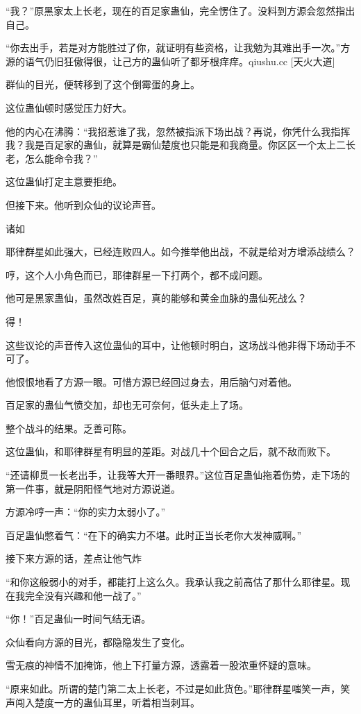 \begin{this_body}
“我？”原黑家太上长老，现在的百足家蛊仙，完全愣住了。没料到方源会忽然指出自己。

“你去出手，若是对方能胜过了你，就证明有些资格，让我勉为其难出手一次。”方源的语气仍旧狂傲得很，让己方的蛊仙听了都牙根痒痒。qiushu.cc [天火大道]

群仙的目光，便转移到了这个倒霉蛋的身上。

这位蛊仙顿时感觉压力好大。

他的内心在沸腾：“我招惹谁了我，忽然被指派下场出战？再说，你凭什么我指挥我？我是百足家的蛊仙，就算是霸仙楚度也只能是和我商量。你区区一个太上二长老，怎么能命令我？”

这位蛊仙打定主意要拒绝。

但接下来。他听到众仙的议论声音。

诸如

耶律群星如此强大，已经连败四人。如今推举他出战，不就是给对方增添战绩么？

哼，这个人小角色而已，耶律群星一下打两个，都不成问题。

他可是黑家蛊仙，虽然改姓百足，真的能够和黄金血脉的蛊仙死战么？

得！

这些议论的声音传入这位蛊仙的耳中，让他顿时明白，这场战斗他非得下场动手不可了。

他恨恨地看了方源一眼。可惜方源已经回过身去，用后脑勺对着他。

百足家的蛊仙气愤交加，却也无可奈何，低头走上了场。

整个战斗的结果。乏善可陈。

这位蛊仙，和耶律群星有明显的差距。对战几十个回合之后，就不敌而败下。

“还请柳贯一长老出手，让我等大开一番眼界。”这位百足蛊仙拖着伤势，走下场的第一件事，就是阴阳怪气地对方源说道。

方源冷哼一声：“你的实力太弱小了。”

百足蛊仙憋着气：“在下的确实力不堪。此时正当长老你大发神威啊。”

接下来方源的话，差点让他气炸

“和你这般弱小的对手，都能打上这么久。我承认我之前高估了那什么耶律星。现在我完全没有兴趣和他一战了。”

“你！”百足蛊仙一时间气结无语。

众仙看向方源的目光，都隐隐发生了变化。

雪无痕的神情不加掩饰，他上下打量方源，透露着一股浓重怀疑的意味。

“原来如此。所谓的楚门第二太上长老，不过是如此货色。”耶律群星嗤笑一声，笑声闯入楚度一方的蛊仙耳里，听着相当刺耳。


\end{this_body}

